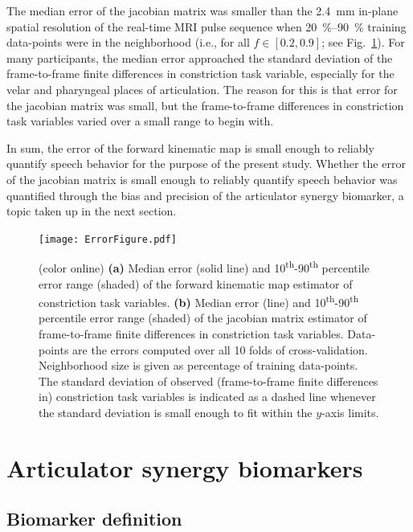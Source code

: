 \documentclass[preprint]{JASAnew}\usepackage[]{graphicx}\usepackage[]{color}
\begin{document}
The median error of the jacobian matrix was smaller than the \SI{2.4}{\milli\meter} in-plane spatial resolution of the real-time MRI pulse sequence when \SIrange{20}{90}{\percent} training data-points were in the neighborhood (i.e., for all $f\in \left[ 0.2, 0.9\right]$; see Fig.~\ref{fig:cverrors}).
%
For many participants, the median error approached the standard deviation of the frame-to-frame finite differences in constriction task variable, especially for the velar and pharyngeal places of articulation.
%
The reason for this is that error for the jacobian matrix was small, but the frame-to-frame differences in constriction task variables varied over a small range to begin with. 

In sum, the error of the forward kinematic map is small enough to reliably quantify speech behavior for the purpose of the present study.
% 
Whether the error of the jacobian matrix is small enough to reliably quantify speech behavior was quantified through the bias and precision of the articulator synergy biomarker, a topic taken up in the next section. 

\begin{figure}
\raggedright

\texttt{[image: ErrorFigure.pdf]}

\caption{(color online) 
{\bf (a)} Median error (solid line) and 10\textsuperscript{th}-90\textsuperscript{th} percentile error range (shaded) of the forward kinematic map estimator of constriction task variables. {\bf (b)} Median error (line) and 10\textsuperscript{th}-90\textsuperscript{th} percentile error range (shaded) of the jacobian matrix estimator of frame-to-frame finite differences in constriction task variables. 
Data-points are the errors computed over all 10 folds of cross-validation.
Neighborhood size is given as percentage of training data-points.
The standard deviation of observed (frame-to-frame finite differences in) constriction task variables is indicated as a dashed line whenever the standard deviation is small enough to fit within the $y$-axis limits.}
\label{fig:cverrors}
\end{figure}




\section{Articulator synergy biomarkers}
\label{sec:articulator_synergy_biomarker}

\subsection{Biomarker definition}
\end{document}
